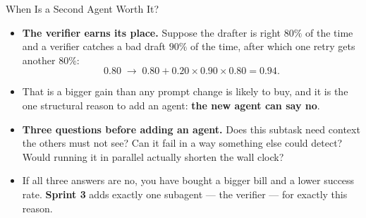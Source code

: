 \begin{frame}{When Is a Second Agent Worth It?}
\begin{itemize}
  \item \textbf{The verifier earns its place.} Suppose the drafter is right $80\%$ of the time and a verifier catches a bad draft $90\%$ of the time, after which one retry gets another $80\%$:
  \[
    0.80 \;\longrightarrow\; 0.80 + 0.20 \times 0.90 \times 0.80 = \mathbf{0.94}.
  \]
  \pause
  \item That is a bigger gain than any prompt change is likely to buy, and it is the one structural reason to add an agent: \textbf{the new agent can say no}.
  \pause
  \item \textbf{Three questions before adding an agent.} Does this subtask need context the others must not see? Can it fail in a way something else could detect? Would running it in parallel actually shorten the wall clock?
  \pause
  \item If all three answers are no, you have bought a bigger bill and a lower success rate. \textbf{Sprint 3} adds exactly one subagent --- the verifier --- for exactly this reason.
\end{itemize}
\end{frame}
